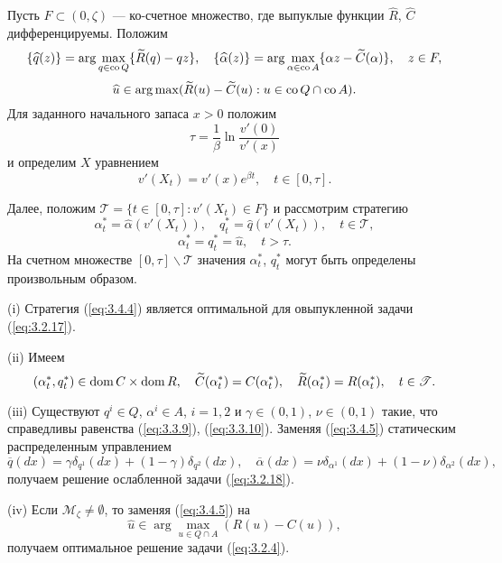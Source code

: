 \begin{theorem} \label{th:3.6}
Пусть $F\subset (0,\zeta)$ --- ко-счетное множество, где выпуклые функции $\widehat R$, $\widehat C$ дифференцируемы. Положим
$$ \{\widehat q(z)\}=\arg\max_{q\in {\rm co\,} Q} \{\widetilde R(q)-q z\},\quad
   \{\widehat\alpha(z)\}=\arg\max_{\alpha\in{\rm co\,} A}\{\alpha z-\widetilde C(\alpha)\},\quad z\in F,$$
$$\widehat u\in\arg\max(\widetilde R(u)-\widetilde C(u):u\in{\rm co\,} Q\cap{\rm co\,} A).$$
Для заданного начального запаса $x>0$ положим
$$\tau=\frac{1}{\beta}\ln\frac{v'(0)}{v'(x)}$$
и определим $X$ уравнением
\begin{equation} \label{eq:3.4.3}
v'(X_t)=v'(x)e^{\beta t},\quad t\in [0,\tau].
\end{equation}

Далее, положим $\mathscr T=\{t\in [0,\tau]:v'(X_t)\in F\}$ и рассмотрим стратегию
\begin{equation} \label{eq:3.4.4}
\alpha^*_t=\widehat\alpha(v'(X_t)),\quad q^*_t=\widehat q(v'(X_t)),\quad t\in\mathscr T,
\end{equation}
\begin{equation} \label{eq:3.4.5}
 \alpha^*_t=q^*_t=\widehat u,\quad t>\tau.
\end{equation}
На счетном множестве $[0,\tau]\backslash \mathscr T$ значения $\alpha^*_t$, $q_t^*$ могут быть определены произвольным образом.

(i) Стратегия (\ref{eq:3.4.4}) является оптимальной для овыпукленной задачи (\ref{eq:3.2.17}).

(ii) Имеем
\begin{equation} \label{eq:3.4.6}
(\alpha_t^*,q_t^*)\in{\rm dom\,} C\times{\rm dom\,} R,\quad \widetilde C(\alpha^*_t)=C(\alpha^*_t),\quad \widetilde R(\alpha_t^*)=R(\alpha_t^*),\quad t\in\mathscr T.
\end{equation}

(iii) Существуют $q^i\in Q$, $\alpha^i\in A$, $i=1,2$ и $\gamma\in (0,1)$, $\nu\in (0,1)$ такие, что справедливы равенства (\ref{eq:3.3.9}), (\ref{eq:3.3.10}). Заменяя (\ref{eq:3.4.5}) статическим распределенным управлением
\begin{equation} \label{eq:3.4.7}
\overline q(dx)=\gamma\delta_{q^1}(dx)+(1-\gamma)\delta_{q^2}(dx),\quad
 \overline \alpha(dx)=\nu\delta_{\alpha^1}(dx)+(1-\nu)\delta_{\alpha^2}(dx),
\end{equation}
получаем решение ослабленной задачи (\ref{eq:3.2.18}).

(iv) Если $\mathscr M_\zeta\neq\emptyset$, то заменяя (\ref{eq:3.4.5}) на
\begin{equation} \label{eq:3.4.8}
\widehat u\in\arg\max_{u\in Q\cap A}(R(u)-C(u)),
\end{equation}
получаем оптимальное решение задачи (\ref{eq:3.2.4}).
\end{theorem}

